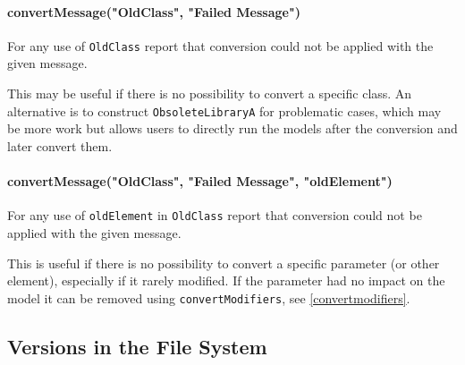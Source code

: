 \paragraph*{convertMessage("OldClass", "Failed Message")}\label{convertmessageoldclass-failed-message}

For any use of \lstinline!OldClass! report that conversion could not be applied with the given message.

\begin{nonnormative}
This may be useful if there is no possibility to convert a specific class.
An alternative is to construct \lstinline!ObsoleteLibraryA! for problematic cases, which may be more work but allows users to directly run the models after the conversion and later convert them.
\end{nonnormative}

\paragraph*{convertMessage("OldClass", "Failed Message", "oldElement")}\label{convertmessageoldclass-failed-message2}

For any use of \lstinline!oldElement! in \lstinline!OldClass! report that conversion could not be applied with the given message.

\begin{nonnormative}
This is useful if there is no possibility to convert a specific parameter (or other element), especially if it rarely modified.
If the parameter had no impact on the model it can be removed using \lstinline!convertModifiers!, see \cref{convertmodifiers}.
\end{nonnormative}


\subsection{Versions in the File System}\label{mapping-of-versions-to-file-system}\label{versions-in-the-File-System}

